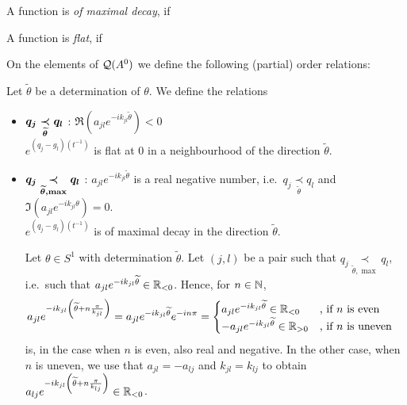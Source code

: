 \begin{defn}
  \begin{comment}
    See \cite{hotta2008}
  \end{comment}
  A function is \emph{of maximal decay}, if \TODO{}

  A function is \emph{flat}, if \TODO{}
\end{defn}

On the elements of $\cQ(A^0)$ we define the following (partial) order
relations:
\begin{defn}
  Let $\tilde\theta$ be a determination of $\theta$.
  We define the relations
  \begin{itemize}
    \item $\boldmath q_j \underset{\tilde\theta}{\prec} q_l$
      :\Leftrightarrow{} $\Re(a_{jl}e^{-ik_{jl}\tilde\theta})<0$
    \\\Leftrightarrow{} $e^{(q_j-g_l)(t^{-1})}$ is
      flat at $0$ in a neighbourhood of the direction $\tilde\theta$.
    \item $\boldmath q_j \underset{\tilde\theta,\max}{\prec} q_l$
      :\Leftrightarrow{} $a_{jl}e^{-ik_{jl}\tilde\theta}$ is a real negative
      number, i.e.\ $q_j \underset{\tilde\theta}{\prec} q_l$ and
      $\Im(a_{jl}e^{-ik_{jl}\theta})=0$.
      \\\Leftrightarrow{} $e^{(q_j-g_l)(t^{-1})}$ is of maximal
      decay in the direction $\tilde\theta$.
      \begin{comment}
        \Leftrightarrow{} $q_{jl}(t^{-1})\in\R_{<0}$ along $\tilde\theta$.
      \end{comment}
      \begin{s-rem} \label{rem:rotationalSym}
        Let $\theta\in S^1$ with determination $\tilde\theta$.
        Let $(j,l)$ be a pair such that
        $q_j \underset{\tilde\theta,\max}{\prec} q_l$, i.e.\ such that
        $a_{jl}e^{-ik_{jl}\tilde\theta}\in\R_{<0}$.
        Hence, for $n\in\N$,
        \begin{align*}
          a_{jl}e^{-ik_{jl}\left(\tilde\theta+n\frac{\pi}{k_{jl}}\right)}
          &=a_{jl}e^{-ik_{jl}\tilde\theta}e^{-in\pi}
          = \begin{cases}
            a_{jl}e^{-ik_{jl}\tilde\theta}\in\R_{<0} 
              & \text{, if $n$ is even}
          \\-a_{jl}e^{-ik_{jl}\tilde\theta}\in\R_{>0} 
              & \text{, if $n$ is uneven}
          \end{cases}
        \end{align*}
        is, in the case when $n$ is even, also real and negative. In the other
        case, when $n$ is uneven, we use that $a_{jl}=-a_{lj}$ and
        $k_{jl}=k_{lj}$ to obtain
        $a_{lj}e^{-ik_{jl}\left(\tilde\theta+n\frac{\pi}{k_{lj}}\right)}
        \in\R_{<0}$.


\end{s-rem}
\end{itemize}
\end{defn}
